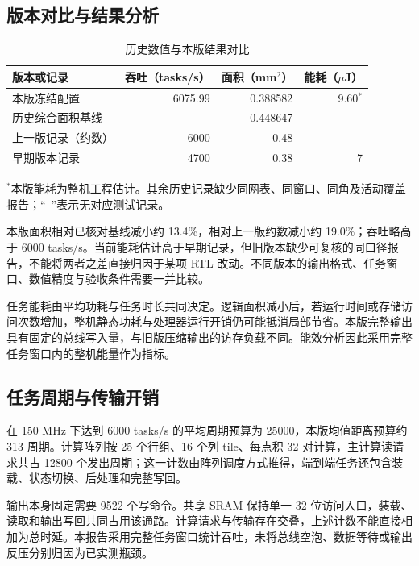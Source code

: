 \documentclass[UTF8,punct,fontset=none,zihao=-4]{ctexart}
\newcommand{\captionnote}[1]{{\small\noindent #1\par}}
\begin{document}
\subsection{版本对比与结果分析}
\begin{table}[H]\centering\small
\caption{历史数值与本版结果对比}
\begin{tabularx}{\linewidth}{Yrrr}\toprule
版本或记录 & 吞吐（tasks/s） & 面积（mm$^2$） & 能耗（$\mu$J）\\\midrule
本版冻结配置 & 6075.99 & 0.388582 & 9.60$^{*}$\\
历史综合面积基线 & -- & 0.448647 & --\\
上一版记录（约数） & 6000 & 0.48 & --\\
早期版本记录 & 4700 & 0.38 & 7\\
\bottomrule\end{tabularx}
\captionnote{$^{*}$本版能耗为整机工程估计。其余历史记录缺少同网表、同窗口、同角及活动覆盖报告；“--”表示无对应测试记录。}
\end{table}

本版面积相对已核对基线减小约 13.4\%，相对上一版约数减小约 19.0\%；吞吐略高于 6000 tasks/s。当前能耗估计高于早期记录，但旧版本缺少可复核的同口径报告，不能将两者之差直接归因于某项 RTL 改动。不同版本的输出格式、任务窗口、数值精度与验收条件需要一并比较。

任务能耗由平均功耗与任务时长共同决定。逻辑面积减小后，若运行时间或存储访问次数增加，整机静态功耗与处理器运行开销仍可能抵消局部节省。本版完整输出具有固定的总线写入量，与旧版压缩输出的访存负载不同。能效分析因此采用完整任务窗口内的整机能量作为指标。

\subsection{任务周期与传输开销}
在 150 MHz 下达到 6000 tasks/s 的平均周期预算为 25000，本版均值距离预算约 313 周期。计算阵列按 25 个行组、16 个列 tile、每点积 32 对计算，主计算读请求共占 12800 个发出周期；这一计数由阵列调度方式推得，端到端任务还包含装载、状态切换、后处理和完整写回。

输出本身固定需要 9522 个写命令。共享 SRAM 保持单一 32 位访问入口，装载、读取和输出写回共同占用该通路。计算请求与传输存在交叠，上述计数不能直接相加为总时延。本报告采用完整任务窗口统计吞吐，未将总线空泡、数据等待或输出反压分别归因为已实测瓶颈。
\end{document}
